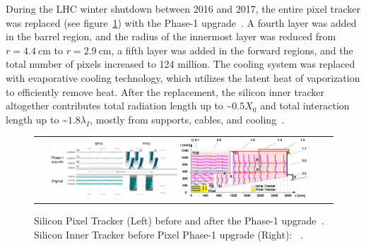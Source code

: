During the LHC winter shutdown between 2016 and 2017, the entire pixel tracker was replaced (see figure~\ref{Inner_Tracker}) with the Phase-1 upgrade~\cite{Lipinski_2017}.
A fourth layer was added in the barrel region, and the radius of the innermost layer was reduced from $r = \SI{4.4}{\cm}$ to $r = \SI{2.9}{\cm}$, a fifth layer was added in the forward regions, and the total number of pixels increased to 124 million.
The cooling system was replaced with evaporative  cooling technology, which utilizes the latent heat of vaporization to efficiently remove heat.
After the replacement, the silicon inner tracker altogether contributes total radiation length up to \sim$0.5 X_0$ and total interaction length up to \sim$1.8 \lambda_I$, mostly from supports, cables, and cooling~\cite{Sirunyan:2270046}.
\begin{figure}[htb]
  \begin{center}
    \begin{tabular}{cc}
        \includegraphics[width=0.45\textwidth]{fig_LHC_CMS/Pixel_Upgrade.png}
        \includegraphics[width=0.45\textwidth]{fig_LHC_CMS/Inner_Tracker.png}
    \end{tabular}
    \caption{Silicon Pixel Tracker (Left) before and after the Phase-1 upgrade~\cite{Adam_2021}.
             Silicon Inner Tracker before Pixel Phase-1 upgrade (Right): ~\cite{Chatrchyan:1211825}.
            }
    \label{Inner_Tracker}
  \end{center}
\end{figure}


